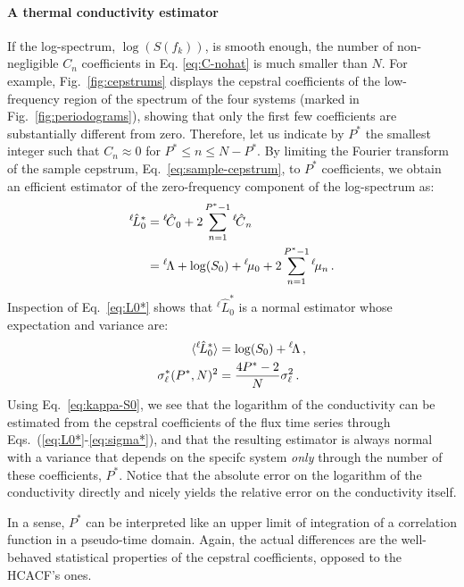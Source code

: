 \paragraph{A thermal conductivity estimator}
If the log-spectrum, $\log(S(f_k))$, is smooth enough, the number of non-negligible $C_n$ coefficients in Eq. \eqref{eq:C-nohat} is much smaller than $N$. 
For example, Fig.~\ref{fig:cepstrums} displays the cepstral coefficients of the low-frequency region of the spectrum of the four systems (marked in Fig.~\ref{fig:periodograms}), showing that only the first few coefficients are substantially different from zero. 
Therefore, let us indicate by $P^*$ the smallest integer such that $C_n \approx 0$ for $P^* \le n \le N-P^*$. By limiting the Fourier transform of the sample cepstrum, Eq.~\eqref{eq:sample-cepstrum}, to $P^*$ coefficients, we obtain an efficient estimator of the zero-frequency component of the log-spectrum as:
\begin{equation}
  \begin{aligned}
    ^{\ell\!}\hat{L}_{0}^{*} & = {^{\ell\!}\hat{C}}_{0} + 2 \sum_{n=1}^{P^{*}-1} {^{\ell\!}\hat{C}}_{n} \\
    & = {^{\ell\!}\rLambda} + \log(S_0) + {^{\ell\!} \mu_{0}} + 2 \sum_{n=1}^{P^*-1} {^{\ell\!}} \mu_{n} \,.
  \end{aligned} \label{eq:L0*}
\end{equation}
Inspection of Eq.~\eqref{eq:L0*} shows that $^{\ell\!}\hat{L}_{0}^{*}$ is a normal estimator whose expectation and variance are:
\begin{align}
	\langle {^{\ell\!}}\hat{L}_{0}^{*} \rangle &= \log(S_{0}) + {^{\ell\!}}\rLambda \,, \label{eq:L*} \\
	\sigma_\ell^{*}(P^{*},N)^{2} &= \frac{4P^{*}-2}{N} \sigma_{\ell}^{2} \,. \label{eq:sigma*}
\end{align}
Using Eq.~\eqref{eq:kappa-S0}, we see that the logarithm of the conductivity can be estimated from the cepstral coefficients of the flux time series through Eqs.~(\ref{eq:L0*}-\ref{eq:sigma*}), and that the resulting estimator is always normal with a variance that depends on the specifc system \emph{only} through the number of these coefficients, $P^*$. Notice that the absolute error on the logarithm of the conductivity directly and nicely yields the relative error on the conductivity itself.
\begin{LEtext}
In a sense, $P^*$ can be interpreted like an upper limit of integration of a correlation function in a pseudo-time domain. Again, the actual differences are the well-behaved statistical properties of the cepstral coefficients, opposed to the HCACF's ones.
\end{LEtext}

